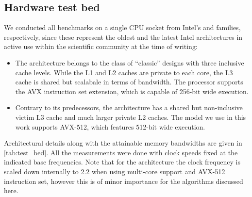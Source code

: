 \subsection{Hardware test bed}
We conducted all benchmarks on a single CPU socket from Intel's \IVB and  \SKX families, respectively, since these  represent the oldest and the latest Intel architectures in active use within the scientific community at the time of writing:
\begin{itemize}
\item The \Intel \IVB architecture belongs to the class of ``classic'' designs with three inclusive cache levels. While the L1 and L2 caches are private to each core, the L3 cache is shared but scalabale in terms of bandwidth. The processor supports the AVX instruction set extension, which is capable of 256-bit wide \SIMD execution.
\item Contrary to its predecessors, the \Intel \SKX architecture has a shared but non-inclusive victim L3 cache and much larger private L2 caches. The model we use in this work supports AVX-512, which features 512-bit wide \SIMD execution.
 
\end{itemize}
Architectural details along with the attainable memory bandwidths are given in \cref{tab:test_bed}. 
All the measurements were done with \CPU clock speeds fixed at the indicated base frequencies. Note that for the \SKX architecture the clock frequency is scaled down internally to 2.2 \GHZ when using multi-core support and AVX-512 instruction set, however this is of minor importance for the algorithms discussed here.
